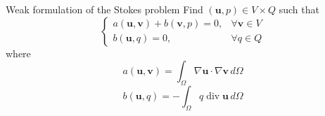 \documentclass[aspectratio=169]{beamer}
\begin{document}

\begin{frame}{\Large Weak formulation of the Stokes problem}
  \Large
  Find $(\mathbf{u}, p) \in V \times Q$ such that
  \begin{equation*}
    \begin{cases}
      a(\mathbf{u}, \mathbf{v}) + b(\mathbf{v}, p) = 0, & \forall \mathbf{v} \in V \\
      b(\mathbf{u}, q) = 0, & \forall q \in Q
    \end{cases}
  \end{equation*}
  where
  \begin{equation*}
    a(\mathbf{u}, \mathbf{v})
    = \int_{\Omega} \nabla \mathbf{u} \cdot \nabla \mathbf{v} \, d\Omega 
  \end{equation*}
  \begin{equation*}
    b(\mathbf{u}, q)
    = -\int_{\Omega} q\operatorname{div} \mathbf{u} \, d\Omega
  \end{equation*}
\end{frame}
\end{document}
